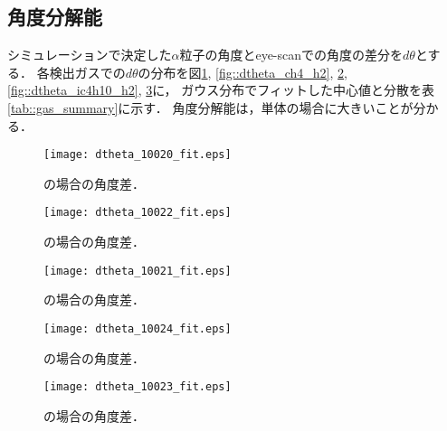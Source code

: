 \documentclass[../master]{subfiles}
\begin{document}

\subsection{角度分解能}
シミュレーションで決定した$\alpha$粒子の角度とeye-scanでの角度の差分を$d\theta$とする．
各検出ガスでの$d\theta$の分布を図\ref{fig::dtheta_ch4}, \ref{fig::dtheta_ch4_h2}, \ref{fig::dtheta_ch4_he},
\ref{fig::dtheta_ic4h10_h2}, \ref{fig::dtheta_ic4h10_he}に，
ガウス分布でフィットした中心値と分散を表\ref{tab::gas_summary}に示す．
角度分解能は，\Methane 単体の場合に大きいことが分かる．
\begin{figure}
  \centering
  \begin{minipage}{0.45\columnwidth}
    \centering
    \texttt{[image: dtheta\_10020\_fit.eps]}
    \caption{\Methane の場合の角度差．}
    \label{fig::dtheta_ch4}
  \end{minipage}  
\end{figure}
\begin{figure}
  \centering
  \begin{minipage}{0.45\columnwidth}
    \centering
    \texttt{[image: dtheta\_10022\_fit.eps]}
    \caption{\MethaneHydro の場合の角度差．}
    \label{fig::dtheta_ch4_h2}
  \end{minipage}
  \begin{minipage}{0.45\columnwidth}
    \centering
    \texttt{[image: dtheta\_10021\_fit.eps]}
    \caption{\MethaneHerium の場合の角度差．}
    \label{fig::dtheta_ch4_he}
  \end{minipage}
\end{figure}
\begin{figure}
  \centering
  \begin{minipage}{0.45\columnwidth}
    \centering
    \texttt{[image: dtheta\_10024\_fit.eps]}
    \caption{\isoButaneHydro の場合の角度差．}
    \label{fig::dtheta_ic4h10_h2}
  \end{minipage}
  \begin{minipage}{0.45\columnwidth}
    \centering
    \texttt{[image: dtheta\_10023\_fit.eps]}
    \caption{\isoButaneHerium の場合の角度差．}
    \label{fig::dtheta_ic4h10_he}
  \end{minipage}
\end{figure}
\end{document}
